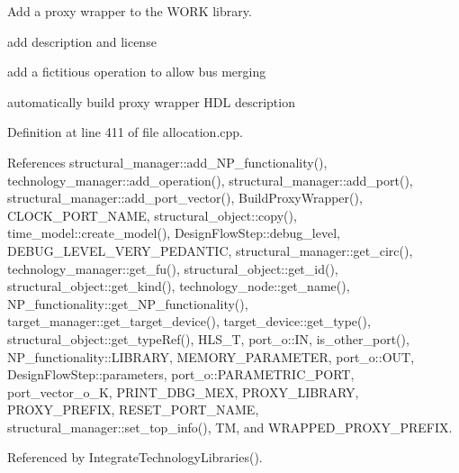 Add a proxy wrapper to the W\+O\+RK library. 

add description and license

add a fictitious operation to allow bus merging

automatically build proxy wrapper H\+DL description 

Definition at line 411 of file allocation.\+cpp.



References structural\+\_\+manager\+::add\+\_\+\+N\+P\+\_\+functionality(), technology\+\_\+manager\+::add\+\_\+operation(), structural\+\_\+manager\+::add\+\_\+port(), structural\+\_\+manager\+::add\+\_\+port\+\_\+vector(), Build\+Proxy\+Wrapper(), C\+L\+O\+C\+K\+\_\+\+P\+O\+R\+T\+\_\+\+N\+A\+ME, structural\+\_\+object\+::copy(), time\+\_\+model\+::create\+\_\+model(), Design\+Flow\+Step\+::debug\+\_\+level, D\+E\+B\+U\+G\+\_\+\+L\+E\+V\+E\+L\+\_\+\+V\+E\+R\+Y\+\_\+\+P\+E\+D\+A\+N\+T\+IC, structural\+\_\+manager\+::get\+\_\+circ(), technology\+\_\+manager\+::get\+\_\+fu(), structural\+\_\+object\+::get\+\_\+id(), structural\+\_\+object\+::get\+\_\+kind(), technology\+\_\+node\+::get\+\_\+name(), N\+P\+\_\+functionality\+::get\+\_\+\+N\+P\+\_\+functionality(), target\+\_\+manager\+::get\+\_\+target\+\_\+device(), target\+\_\+device\+::get\+\_\+type(), structural\+\_\+object\+::get\+\_\+type\+Ref(), H\+L\+S\+\_\+T, port\+\_\+o\+::\+IN, is\+\_\+other\+\_\+port(), N\+P\+\_\+functionality\+::\+L\+I\+B\+R\+A\+RY, M\+E\+M\+O\+R\+Y\+\_\+\+P\+A\+R\+A\+M\+E\+T\+ER, port\+\_\+o\+::\+O\+UT, Design\+Flow\+Step\+::parameters, port\+\_\+o\+::\+P\+A\+R\+A\+M\+E\+T\+R\+I\+C\+\_\+\+P\+O\+RT, port\+\_\+vector\+\_\+o\+\_\+K, P\+R\+I\+N\+T\+\_\+\+D\+B\+G\+\_\+\+M\+EX, P\+R\+O\+X\+Y\+\_\+\+L\+I\+B\+R\+A\+RY, P\+R\+O\+X\+Y\+\_\+\+P\+R\+E\+F\+IX, R\+E\+S\+E\+T\+\_\+\+P\+O\+R\+T\+\_\+\+N\+A\+ME, structural\+\_\+manager\+::set\+\_\+top\+\_\+info(), TM, and W\+R\+A\+P\+P\+E\+D\+\_\+\+P\+R\+O\+X\+Y\+\_\+\+P\+R\+E\+F\+IX.



Referenced by Integrate\+Technology\+Libraries().

